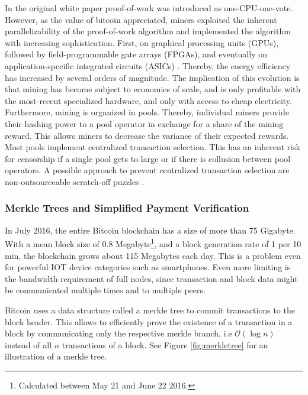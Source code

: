 In the original white paper proof-of-work was introduced as one-CPU-one-vote. However, as the value of bitcoin appreciated, miners exploited the inherent parallelizability of the proof-of-work algorithm and implemented the algorithm with increasing sophistication. First, on graphical processing units (GPUs), followed by field-programmable gate arrays (FPGAs), and eventually on application-specific integrated circuits (ASICs) \parencite{taylor2013bitcoin}. Thereby, the energy efficiency has increased by several orders of magnitude. The implication of this evolution is that mining has become subject to economies of scale, and is only profitable with the most-recent specialized hardware, and only with access to cheap electricity. Furthermore, mining is organized in pools. Thereby, individual miners provide their hashing power to a pool operator in exchange for a share of the mining reward. This allows miners to decrease the variance of their expected rewards. Most pools implement centralized transaction selection. This has an inherent risk for censorship if a single pool gets to large or if there is collusion between pool operators. A possible approach to prevent centralized transaction selection are non-outsourceable scratch-off puzzles \parencite{Miller:2015:NSP:2810103.2813621}.  

\subsubsection{Merkle Trees and Simplified Payment Verification}
\label{sec:spv}

In July 2016, the entire Bitcoin blockchain has a size of more than 75 Gigabyte. With a mean block size of 0.8 Megabyte\footnote{Calculated between May 21 and June 22 2016.}, and a block generation rate of 1 per 10 min, the blockchain grows about 115 Megabytes each day. This is a problem even for powerful \ac{IOT} device categories such as smartphones. Even more limiting is the bandwidth requirement of full nodes, since transaction and block data might be communicated multiple times and to multiple peers. 

Bitcoin uses a data structure called a merkle tree \parencite{merkle1980protocols} to commit transactions to the block header. This allows to efficiently prove the existence of a transaction in a block by communicating only the respective merkle branch, i.e $\mathcal{O}(\log{}n)$ instead of all $n$ transactions of a block. See Figure \ref{fig:merkletree} for an illustration of a merkle tree. 

